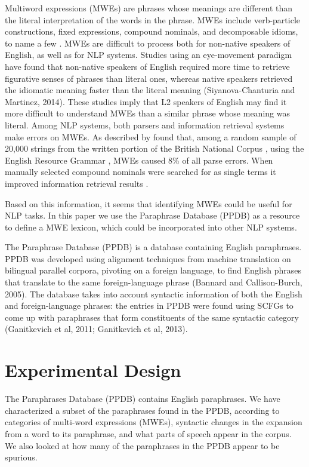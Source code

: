 \documentclass[11pt]{article}
\begin{document}
Multiword expressions (MWEs) are phrases whose meanings are different than the literal interpretation of the words in the phrase. MWEs include verb-particle constructions, fixed expressions, compound nominals, and decomposable idioms, to name a few \cite{Sag2002}.  MWEs are difficult to process both for non-native speakers of English, as well as for NLP systems. Studies using an eye-movement paradigm have found that non-native speakers of English required more time to retrieve figurative senses of phrases than literal ones, whereas native speakers retrieved the idiomatic meaning faster than the literal meaning (Siyanova-Chanturia and Martinez, 2014). These studies imply that L2 speakers of English may find it more difficult to understand MWEs than a similar phrase whose meaning was literal.  Among NLP systems, both parsers and information retrieval systems make errors on MWEs. As described by  found that, among a random sample of 20,000 strings from the written portion of the British National Corpus \citep{Burnard2000}, using the English Resource Grammar \citep{Copestake+Flickinger2000}, MWEs caused 8\% of all parse errors. When manually­ selected compound nominals were searched for as single terms it improved information retrieval results \citep{Acosta2011}.

Based on this information, it seems that identifying MWEs could be useful for NLP tasks. In this paper we use the Paraphrase Database (PPDB) as a resource to define a MWE lexicon, which could be incorporated into other NLP systems.

The Paraphrase Database (PPDB) is a database containing English paraphrases. PPDB was developed using alignment techniques from machine translation on bilingual parallel corpora, pivoting on a foreign language, to find English phrases that translate to the same foreign-language phrase (Bannard and Callison-Burch, 2005). The database takes into account syntactic information of both the English and foreign-language phrases: the entries in PPDB were found using SCFGs to come up with paraphrases that form constituents of the same syntactic category (Ganitkevich et al, 2011; Ganitkevich et al, 2013).

\section{Experimental Design}
The Paraphrases Database (PPDB) contains English paraphrases. We have characterized a subset of the paraphrases found in the PPDB, according to categories of multi-word expressions (MWEs), syntactic changes in the expansion from a word to its paraphrase, and what parts of speech appear in the corpus. We also looked at how many of the paraphrases in the PPDB appear to be spurious.
\end{document}
